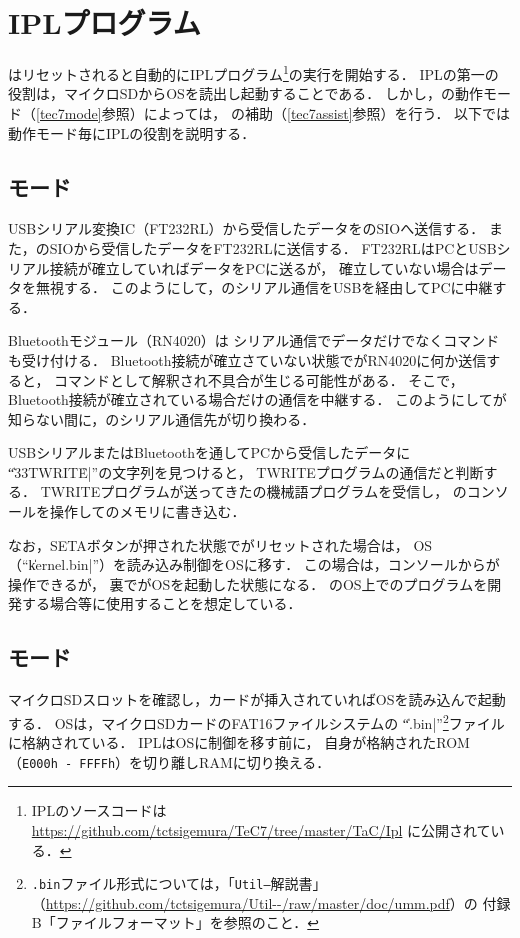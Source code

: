 \section{IPLプログラム}
\label{ipl}
{\tac}はリセットされると自動的にIPLプログラム\footnote{
IPLのソースコードは
\url{https://github.com/tctsigemura/TeC7/tree/master/TaC/Ipl}
に公開されている．
}の実行を開始する．
IPLの第一の役割は，マイクロSDからOSを読出し起動することである．
しかし，{\tecS}の動作モード（\ref{tec7mode}参照）によっては，
{\tec}の補助（\ref{tec7assist}参照）を行う．
以下では動作モード毎にIPLの役割を説明する．

\subsection{{\tec}モード}
USBシリアル変換IC（FT232RL）から受信したデータを{\tec}のSIOへ送信する．
また，{\tec}のSIOから受信したデータをFT232RLに送信する．
FT232RLはPCとUSBシリアル接続が確立していればデータをPCに送るが，
確立していない場合はデータを無視する．
このようにして，{\tec}のシリアル通信をUSBを経由してPCに中継する．

Bluetoothモジュール（RN4020）は
シリアル通信でデータだけでなくコマンドも受け付ける．
Bluetooth接続が確立さていない状態で{\tac}がRN4020に何か送信すると，
コマンドとして解釈され不具合が生じる可能性がある．
そこで，Bluetooth接続が確立されている場合だけ{\tec}の通信を中継する．
このようにして{\tec}が知らない間に，{\tec}のシリアル通信先が切り換わる．

USBシリアルまたはBluetoothを通してPCから受信したデータに
``\|\033TWRITE\r\n|''の文字列を見つけると，
TWRITEプログラムの通信だと判断する．
TWRITEプログラムが送ってきた{\tec}の機械語プログラムを受信し，
{\tec}のコンソールを操作して{\tec}のメモリに書き込む．

なお，SETAボタンが押された状態で{}がリセットされた場合は，
OS（``\|kernel.bin|''）を読み込み制御をOSに移す．
この場合は，コンソールから{\tec}が操作できるが，
裏で{\tac}がOSを起動した状態になる．
{\tac}のOS上で{\tec}のプログラムを開発する場合等に使用することを想定している．

\subsection{{\tac}モード}
マイクロSDスロットを確認し，カードが挿入されていればOSを読み込んで起動する．
OSは，マイクロSDカードのFAT16ファイルシステムの
``\|.bin|''\footnote{
\texttt{.bin}ファイル形式については，「\texttt{Util--}解説書」
（\url{https://github.com/tctsigemura/Util--/raw/master/doc/umm.pdf}）の
付録B「ファイルフォーマット」を参照のこと．
}ファイルに格納されている．
IPLはOSに制御を移す前に，
自身が格納されたROM（\texttt{E000h - FFFFh}）を切り離しRAMに切り換える．

